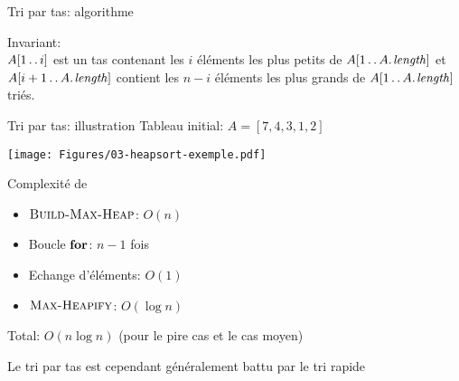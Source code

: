 \begin{frame}{Tri par tas: algorithme}

\begin{center}
\end{center}

\bigskip

{\small
Invariant:\\
$A[1\mathinner{\ldotp\ldotp} i]$ est un tas contenant les $i$ éléments les plus petits de $A[1\twodots \attrib{A}{length}]$ et $A[i+1\twodots \attrib{A}{length}]$ contient les $n-i$ éléments les plus grands de $A[1\twodots \attrib{A}{length}]$ triés.
}
\end{frame}

\begin{frame}{Tri par tas: illustration}
Tableau initial: $A=[7,4,3,1,2]$

\bigskip

\centerline{\texttt{[image: Figures/03-heapsort-exemple.pdf]}}

\end{frame}

\begin{frame}{Complexité de }
\begin{center}\small
{}
\end{center}

\begin{itemize}
\item $\textnormal{\scshape Build-Max-Heap}$: $O(n)$
\item Boucle $\textbf{for}$: $n-1$ fois
\item Echange d'éléments: $O(1)$
\item $\textnormal{\scshape Max-Heapify}$: $O(\log n)$
\end{itemize}
Total: $O(n\log n)$ \alert{(pour le pire cas et le cas moyen)}

\bigskip

Le tri par tas est cependant généralement battu par le tri rapide
\end{frame}

